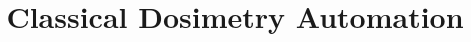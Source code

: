\documentclass{article}
\title{Classical Dosimetry Automation}
\date{}
\begin{document}
	\maketitle
	\setcounter{tocdepth}{5}
	\tableofcontents
	
	\begin{abstract}
		
	\end{abstract}
	
	
	
	
	
	
\end{document}
